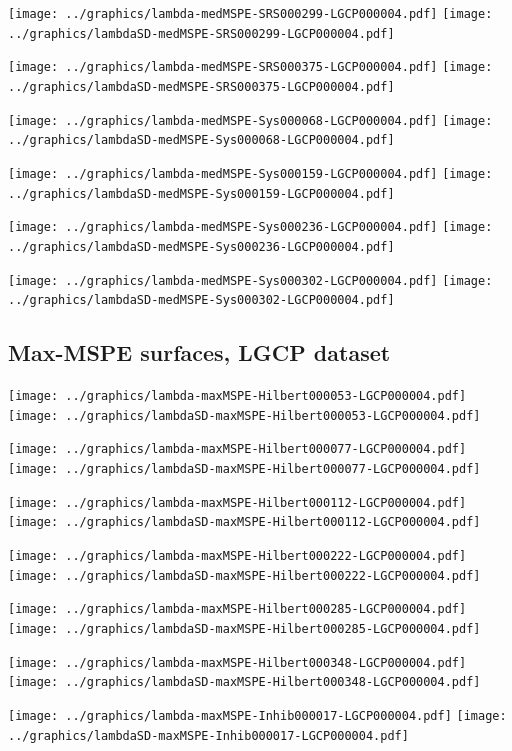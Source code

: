 \documentclass[review]{elsarticle}
\begin{document}
\texttt{[image: ../graphics/lambda-medMSPE-SRS000299-LGCP000004.pdf]}
\texttt{[image: ../graphics/lambdaSD-medMSPE-SRS000299-LGCP000004.pdf]}

\texttt{[image: ../graphics/lambda-medMSPE-SRS000375-LGCP000004.pdf]}
\texttt{[image: ../graphics/lambdaSD-medMSPE-SRS000375-LGCP000004.pdf]}

\texttt{[image: ../graphics/lambda-medMSPE-Sys000068-LGCP000004.pdf]}
\texttt{[image: ../graphics/lambdaSD-medMSPE-Sys000068-LGCP000004.pdf]}

\texttt{[image: ../graphics/lambda-medMSPE-Sys000159-LGCP000004.pdf]}
\texttt{[image: ../graphics/lambdaSD-medMSPE-Sys000159-LGCP000004.pdf]}

\texttt{[image: ../graphics/lambda-medMSPE-Sys000236-LGCP000004.pdf]}
\texttt{[image: ../graphics/lambdaSD-medMSPE-Sys000236-LGCP000004.pdf]}

\texttt{[image: ../graphics/lambda-medMSPE-Sys000302-LGCP000004.pdf]}
\texttt{[image: ../graphics/lambdaSD-medMSPE-Sys000302-LGCP000004.pdf]}

\subsection{Max-MSPE surfaces, LGCP dataset}

\texttt{[image: ../graphics/lambda-maxMSPE-Hilbert000053-LGCP000004.pdf]}
\texttt{[image: ../graphics/lambdaSD-maxMSPE-Hilbert000053-LGCP000004.pdf]}

\texttt{[image: ../graphics/lambda-maxMSPE-Hilbert000077-LGCP000004.pdf]}
\texttt{[image: ../graphics/lambdaSD-maxMSPE-Hilbert000077-LGCP000004.pdf]}

\texttt{[image: ../graphics/lambda-maxMSPE-Hilbert000112-LGCP000004.pdf]}
\texttt{[image: ../graphics/lambdaSD-maxMSPE-Hilbert000112-LGCP000004.pdf]}

\texttt{[image: ../graphics/lambda-maxMSPE-Hilbert000222-LGCP000004.pdf]}
\texttt{[image: ../graphics/lambdaSD-maxMSPE-Hilbert000222-LGCP000004.pdf]}

\texttt{[image: ../graphics/lambda-maxMSPE-Hilbert000285-LGCP000004.pdf]}
\texttt{[image: ../graphics/lambdaSD-maxMSPE-Hilbert000285-LGCP000004.pdf]}

\texttt{[image: ../graphics/lambda-maxMSPE-Hilbert000348-LGCP000004.pdf]}
\texttt{[image: ../graphics/lambdaSD-maxMSPE-Hilbert000348-LGCP000004.pdf]}

\texttt{[image: ../graphics/lambda-maxMSPE-Inhib000017-LGCP000004.pdf]}
\texttt{[image: ../graphics/lambdaSD-maxMSPE-Inhib000017-LGCP000004.pdf]}
\end{document}
